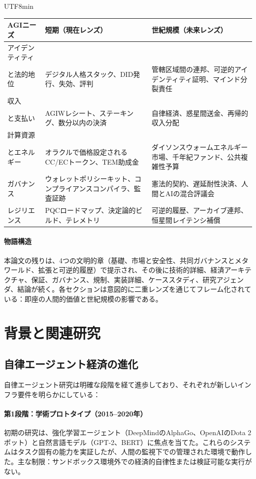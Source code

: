 \documentclass[11pt]{article}
\begin{document}
\begin{CJK}{UTF8}{min}
\begin{longtable}{@{}p{}p{}p{}@{}}
\toprule
\textbf{AGIニーズ} & \textbf{短期（現在レンズ）} & \textbf{世紀規模（未来レンズ）} \\\midrule
アイデンティティ \\ と法的地位 & デジタル人格スタック、DID発行、失効、評判 & 管轄区域間の連邦、可逆的アイデンティティ証明、マインド分裂責任 \\
収入 \\ と支払い & AGIWレシート、ステーキング、数分以内の決済 & 自律経済、惑星間送金、再帰的収入分配 \\
計算資源 \\ とエネルギー & オラクルで価格設定されるCC/ECトークン、TEM助成金 & ダイソンスウォームエネルギー市場、千年紀ファンド、公共複雑性予算 \\
ガバナンス & ウォレットポリシーキット、コンプライアンスコンパイラ、監査証跡 & 憲法的契約、遅延耐性決済、人間とAIの混合評議会 \\
レジリエンス & PQCロードマップ、決定論的ビルド、テレメトリ & 可逆的履歴、アーカイブ連邦、恒星間レイテンシ補償 \\\bottomrule
\end{longtable}

\paragraph{物語構造} 本論文の残りは、4つの文明的章（基礎、市場と安全性、共同ガバナンスとメタワールド、拡張と可逆的履歴）で提示され、その後に技術的詳細、経済アーキテクチャ、保証、ガバナンス、規制、実装詳細、ケーススタディ、研究アジェンダ、結論が続く。各セクションは意図的に二重レンズを通じてフレーム化されている：即座の人間的価値と世紀規模の影響である。

\section{背景と関連研究}
\subsection{自律エージェント経済の進化}
自律エージェント研究は明確な段階を経て進歩しており、それぞれが新しいインフラ要件を明らかにしている：

\paragraph{第1段階：学術プロトタイプ（2015--2020年）} 初期の研究は、強化学習エージェント（DeepMindのAlphaGo、OpenAIのDota 2ボット）と自然言語モデル（GPT-2、BERT）に焦点を当てた。これらのシステムはタスク固有の能力を実証したが、人間の監視下での管理された環境で動作した。主な制限：サンドボックス環境外での経済的自律性または検証可能な実行がない。


\end{CJK}
\end{document}
